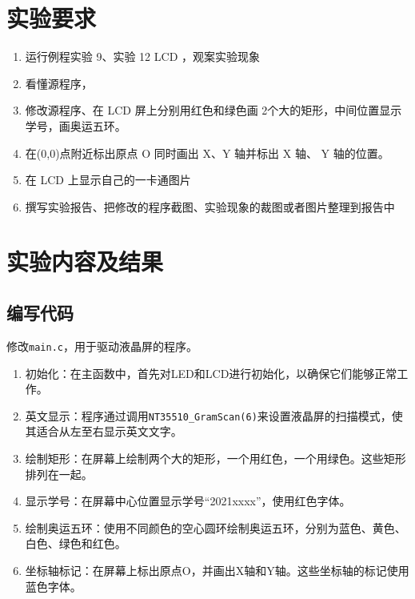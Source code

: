 \documentclass{math201}
\begin{document}

\makecover


\section{实验要求}

\begin{enumerate}
  \item 运行例程实验 9、实验 12 LCD ，观案实验现象
  \item 看懂源程序，
  \item 修改源程序、在 LCD 屏上分别用红色和绿色画 2个大的矩形，中间位置显示学号，画奥运五环。
  \item 在(0,0)点附近标出原点 O 同时画出 X、Y 轴并标出 X 轴、 Y 轴的位置。
  \item 在 LCD 上显示自己的一卡通图片
  \item 撰写实验报告、把修改的程序截图、实验现象的裁图或者图片整理到报告中
\end{enumerate}

\section{实验内容及结果}

\subsection{编写代码}

修改\texttt{main.c}，用于驱动液晶屏的程序。

\begin{enumerate}
  \item 初始化：在主函数中，首先对LED和LCD进行初始化，以确保它们能够正常工作。
  \item 英文显示：程序通过调用\texttt{NT35510\_GramScan(6)}来设置液晶屏的扫描模式，使其适合从左至右显示英文文字。
  \item 绘制矩形：在屏幕上绘制两个大的矩形，一个用红色，一个用绿色。这些矩形排列在一起。
  \item 显示学号：在屏幕中心位置显示学号“2021xxxx”，使用红色字体。
  \item 绘制奥运五环：使用不同颜色的空心圆环绘制奥运五环，分别为蓝色、黄色、白色、绿色和红色。
  \item 坐标轴标记：在屏幕上标出原点O，并画出X轴和Y轴。这些坐标轴的标记使用蓝色字体。
\end{enumerate}
\end{document}

